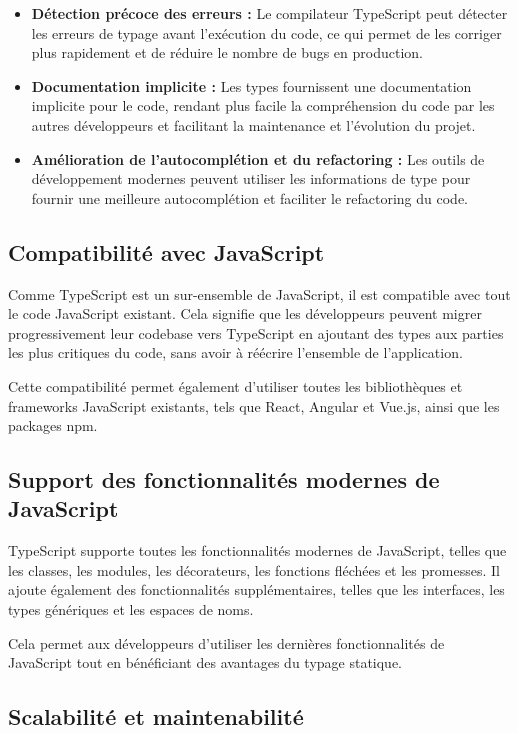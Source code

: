 \begin{itemize}
    \item \textbf{Détection précoce des erreurs :} Le compilateur TypeScript peut détecter les erreurs de typage avant l'exécution du code, ce qui permet de les corriger plus rapidement et de réduire le nombre de bugs en production.
    \item \textbf{Documentation implicite :} Les types fournissent une documentation implicite pour le code, rendant plus facile la compréhension du code par les autres développeurs et facilitant la maintenance et l'évolution du projet.
    \item \textbf{Amélioration de l'autocomplétion et du refactoring :} Les outils de développement modernes peuvent utiliser les informations de type pour fournir une meilleure autocomplétion et faciliter le refactoring du code.
\end{itemize}

\subsection{Compatibilité avec JavaScript}

Comme TypeScript est un sur-ensemble de JavaScript, il est compatible avec tout le code JavaScript existant. Cela signifie que les développeurs peuvent migrer progressivement leur codebase vers TypeScript en ajoutant des types aux parties les plus critiques du code, sans avoir à réécrire l'ensemble de l'application.

Cette compatibilité permet également d'utiliser toutes les bibliothèques et frameworks JavaScript existants, tels que React, Angular et Vue.js, ainsi que les packages npm.

\subsection{Support des fonctionnalités modernes de JavaScript}

TypeScript supporte toutes les fonctionnalités modernes de JavaScript, telles que les classes, les modules, les décorateurs, les fonctions fléchées et les promesses. Il ajoute également des fonctionnalités supplémentaires, telles que les interfaces, les types génériques et les espaces de noms.

Cela permet aux développeurs d'utiliser les dernières fonctionnalités de JavaScript tout en bénéficiant des avantages du typage statique.

\subsection{Scalabilité et maintenabilité}

